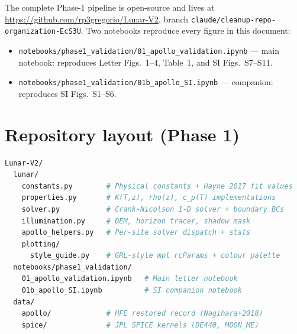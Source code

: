 \documentclass[11pt]{report}
\begin{document}
The complete Phase-1 pipeline is open-source and lives at
\url{https://github.com/rp3gregorio/Lunar-V2}, branch
\texttt{claude/cleanup-repo-organization-EcS3U}. Two notebooks
reproduce every figure in this document:

\begin{itemize}\itemsep2pt
  \item \texttt{notebooks/phase1\_validation/01\_apollo\_validation.ipynb}
        --- main notebook: reproduces Letter Figs.~1--4, Table~1,
        and SI Figs.~S7--S11.
  \item \texttt{notebooks/phase1\_validation/01b\_apollo\_SI.ipynb}
        --- companion: reproduces SI Figs.~S1--S6.
\end{itemize}

\section{Repository layout (Phase 1)}
\begin{lstlisting}[language=bash,caption={Top-level layout of the
Phase-1 deliverables.}]
Lunar-V2/
  lunar/
    constants.py        # Physical constants + Hayne 2017 fit values
    properties.py       # K(T,z), rho(z), c_p(T) implementations
    solver.py           # Crank-Nicolson 1-D solver + boundary BCs
    illumination.py     # DEM, horizon tracer, shadow mask
    apollo_helpers.py   # Per-site solver dispatch + stats
    plotting/
      style_guide.py    # GRL-style mpl rcParams + colour palette
  notebooks/phase1_validation/
    01_apollo_validation.ipynb   # Main letter notebook
    01b_apollo_SI.ipynb          # SI companion notebook
  data/
    apollo/             # HFE restored record (Nagihara+2018)
    spice/              # JPL SPICE kernels (DE440, MOON_ME)
\end{lstlisting}
\end{document}

